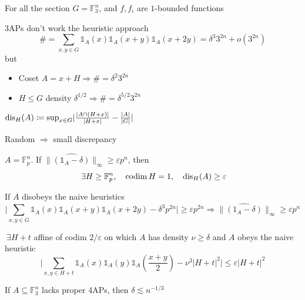 For all the section $G = \mathbb{F}_3^{n}$, and $f, f_i$ are $1$-bounded functions
\begin{proposition} 3APs don't work the heuristic approach
\[
\# = \sum_{x, y \in G} \mathds{1}_A(x) \mathds{1}_A(x+y)\mathds{1}_A(x+2y) = \delta ^3 3^{2n} + o(3^{2n})
\]
but
\begin{itemize}[topsep=-6pt, itemsep=0pt]
    \item Coset $A = x + H \Rightarrow \# = \delta ^2 3 ^{2n}$
    \item $H \leq G$ density $\delta ^{1/2} \Rightarrow \# = \delta ^{5/2}3^{2n}$
\end{itemize}
\end{proposition}

\begin{definition}[Discrepancy]
$\operatorname{dis} _H(A) \coloneqq  \sup_{x \in G} \lvert \frac{\lvert A \cap (H+x) \rvert }{\lvert H+x \rvert } - \frac{\lvert A \rvert }{\lvert G \rvert } \rvert $
\end{definition}

Random $ \Rightarrow $ small discrepancy

\begin{proposition} $A = \mathbb{F}_p^{n}$. If $\lVert \hat{(\mathds{1}_A - \delta)} \rVert _{\infty} \geq \varepsilon p^n$, then
\[
\ \exists H \geq \mathbb{F}_p^n, \quad \operatorname{codim} H = 1, \quad  \operatorname{dis} _H(A) \geq \varepsilon 
\]
\end{proposition}

\begin{proposition} If $A$ disobeys the naive heuristics
\[
\lvert \sum_{x, y \in G} \mathds{1}_A(x) \mathds{1}_A(x+y)\mathds{1}_A(x+2y) - \delta ^3p^{2n} \rvert \geq \varepsilon p^{2n} \Rightarrow 
\lVert \hat{(1_{A}-\delta )} \rVert_{\infty} \geq \varepsilon p^n
\]
\end{proposition}

\begin{proposition}
$\ \exists H + t$ affine of codim $2/\varepsilon $ on which $A$ has density $\nu \geq \delta $ and $A$ obeys the naive heuristic
\[
\lvert \sum_{x, y \in H+t} \mathds{1}_A(x)\mathds{1}_A(y)\mathds{1}_A(\frac{x+y}{2}) - \nu ^3 \lvert H+t \rvert^2  \rvert \leq \varepsilon \lvert H + t \rvert ^2
\]
\end{proposition}

\begin{theorem}[Roth] If $A \subseteq \mathbb{F}_3^n$ lacks proper 4APs, then $\delta \lesssim n^{-1/3}$
\end{theorem}

